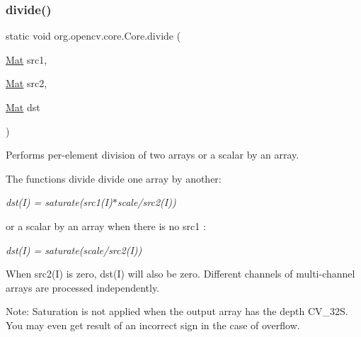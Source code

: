 \subsubsection{\texorpdfstring{divide()}{divide()}\hspace{0.1cm}{\footnotesize\ttfamily [3/8]}}
{\footnotesize\ttfamily static void org.\+opencv.\+core.\+Core.\+divide (\begin{DoxyParamCaption}\item[{\mbox{\hyperlink{classorg_1_1opencv_1_1core_1_1_mat}{Mat}}}]{src1,  }\item[{\mbox{\hyperlink{classorg_1_1opencv_1_1core_1_1_mat}{Mat}}}]{src2,  }\item[{\mbox{\hyperlink{classorg_1_1opencv_1_1core_1_1_mat}{Mat}}}]{dst }\end{DoxyParamCaption})\hspace{0.3cm}{\ttfamily [static]}}

Performs per-\/element division of two arrays or a scalar by an array.

The functions {\ttfamily divide} divide one array by another\+:

{\itshape dst(\+I) = saturate(src1(\+I)$\ast$scale/src2(I))}

or a scalar by an array when there is no {\ttfamily src1} \+:

{\itshape dst(\+I) = saturate(scale/src2(I))}

When {\ttfamily src2(\+I)} is zero, {\ttfamily dst(\+I)} will also be zero. Different channels of multi-\/channel arrays are processed independently.

Note\+: Saturation is not applied when the output array has the depth {\ttfamily C\+V\+\_\+32S}. You may even get result of an incorrect sign in the case of overflow.


